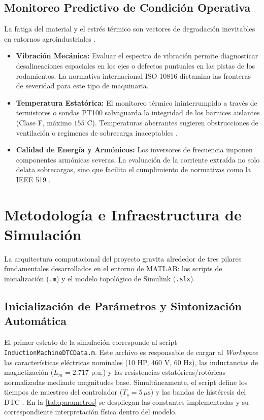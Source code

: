 \documentclass[conference]{IEEEtran}
\begin{document}
\subsection{Monitoreo Predictivo de Condición Operativa}
La fatiga del material y el estrés térmico son vectores de degradación inevitables en entornos agroindustriales \cite{toliyat2012}. 
\begin{itemize}
    \item \textbf{Vibración Mecánica:} Evaluar el espectro de vibración permite diagnosticar desalineaciones espaciales en los ejes o defectos puntuales en las pistas de los rodamientos. La normativa internacional ISO 10816 \cite{iso10816} dictamina las fronteras de severidad para este tipo de maquinaria.
    \item \textbf{Temperatura Estatórica:} El monitoreo térmico ininterrumpido a través de termistores o sondas PT100 salvaguarda la integridad de los barnices aislantes (Clase F, máximo $155^\circ$C). Temperaturas aberrantes sugieren obstrucciones de ventilación o regímenes de sobrecarga inaceptables \cite{nandi2005}.
    \item \textbf{Calidad de Energía y Armónicos:} Los inversores de frecuencia imponen componentes armónicas severas. La evaluación de la corriente extraída no solo delata sobrecargas, sino que facilita el cumplimiento de normativas como la IEEE 519 \cite{ieee519}.
\end{itemize}

\section{Metodología e Infraestructura de Simulación}

La arquitectura computacional del proyecto gravita alrededor de tres pilares fundamentales desarrollados en el entorno de MATLAB: los scripts de inicialización (\texttt{.m}) y el modelo topológico de Simulink (\texttt{.slx}).

\subsection{Inicialización de Parámetros y Sintonización Automática}
El primer estrato de la simulación corresponde al script \texttt{InductionMachineDTCData.m}. Este archivo es responsable de cargar al \textit{Workspace} las características eléctricas nominales (10 HP, 460 V, 60 Hz), las inductancias de magnetización ($L_m = 2.717$ p.u.) y las resistencias estatóricas/rotóricas normalizadas mediante magnitudes base. Simultáneamente, el script define los tiempos de muestreo del controlador ($T_s = 5\,\mu\text{s}$) y las bandas de histéresis del DTC \cite{mathworks2023}. En la \autoref{tab:parametros} se despliegan las constantes implementadas y su correspondiente interpretación física dentro del modelo.
\end{document}
